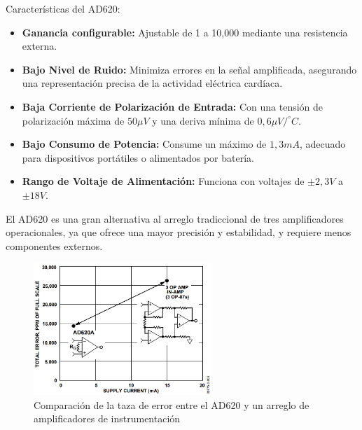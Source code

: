             \hfill \break
            Características del AD620:
            \begin{itemize}
                \item \textbf{Ganancia configurable:} Ajustable de 1 a 10,000 mediante una resistencia externa.
                \item \textbf{Bajo Nivel de Ruido:} Minimiza errores en la señal amplificada, asegurando una representación precisa de la actividad eléctrica cardíaca.
                \item \textbf{Baja Corriente de Polarización de Entrada:} Con una tensión de polarización máxima de $50 \mu V$ y una deriva mínima de $0,6 \mu V / ^{\circ} C$.
                \item \textbf{Bajo Consumo de Potencia:} Consume un máximo de $1,3 mA$, adecuado para dispositivos portátiles o alimentados por batería.
                \item \textbf{Rango de Voltaje de Alimentación:} Funciona con voltajes de $\pm 2,3 V$ a $\pm 18 V$.
            \end{itemize}

            El AD620 es una gran alternativa al arreglo tradiccional de tres amplificadores operacionales, ya que ofrece una mayor precisión y estabilidad, y requiere menos componentes externos. 

            \begin{figure}[H]
                \centering
                \includegraphics[width=0.6\textwidth]{img/Marco/Amplificador_AD620_comparacion.png}
                \caption[Comparación de la taza de error entre el AD620 y un arreglo de amplificadores de instrumentación.]{Comparación de la taza de error entre el AD620 y un arreglo de amplificadores de instrumentación\footnotemark}
                \label{fig:Amplificador_AD620_comparacion}
            \end{figure}

